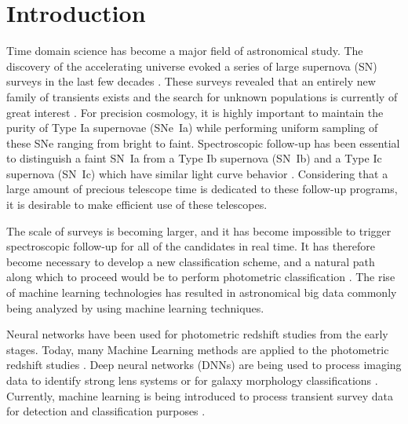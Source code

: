 \documentclass[useamsfonts]{pasj01}
\begin{document}
\section{Introduction}
Time domain science has become a major field of astronomical study. The discovery of the accelerating universe \citep{perlmutter99a,riess98a} evoked a series of large supernova (SN) surveys in the last few decades 
\citep{betoule14a,scolnic18a,brout19a}.    
These surveys revealed that an entirely new family of transients exists and the search for unknown populations is currently of great interest \citep{howell06a,phillips07a,quimby07b}.
For precision cosmology, it is highly important to maintain the purity of Type Ia supernovae (SNe~Ia) while performing uniform sampling of these SNe ranging from bright to faint. 
Spectroscopic follow-up has been essential to distinguish a faint SN~Ia from a Type Ib supernova (SN~Ib) and a Type Ic supernova (SN~Ic) which have similar light curve behavior \citep{scolnic14a}. 
Considering that a large amount of precious telescope time is dedicated to these follow-up programs, it is desirable to make efficient use of these telescopes.

The scale of surveys is becoming larger, and it has become impossible to trigger spectroscopic follow-up for all of the candidates in real time. It has therefore become necessary to develop a new classification scheme, and a natural path along which to proceed would be to perform photometric classification \citep{sako11a,jonesl8a}. The rise of machine learning technologies has resulted in astronomical big data commonly being analyzed by using machine learning techniques.

Neural networks have been used for photometric redshift studies from the early stages. 
Today, many Machine Learning methods are applied to the photometric redshift studies \citep{collister04a,carliles10a,pasquet19a}.
Deep neural networks (DNNs) are being used to process imaging data to identify strong lens systems \citep{petrillo17a} or for galaxy morphology classifications \citep{hausen19a}. 
Currently, machine learning is being introduced to process transient survey data for detection \citep{goldstein15a} and classification purposes \citep{charnock17a}.
\end{document}
